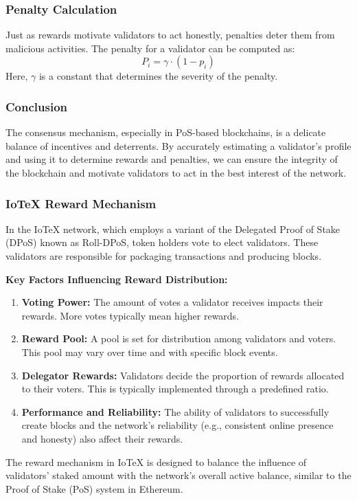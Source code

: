 \documentclass{beamer}
\begin{document}
\begin{frame}
\frametitle{Penalty Calculation}
Just as rewards motivate validators to act honestly, penalties deter them from malicious activities. The penalty for a validator can be computed as:
\[ P_i = \gamma \cdot (1 - p_i) \]
Here, \( \gamma \) is a constant that determines the severity of the penalty.
\end{frame}

\begin{frame}
\frametitle{Conclusion}
The consensus mechanism, especially in PoS-based blockchains, is a delicate balance of incentives and deterrents. By accurately estimating a validator's profile and using it to determine rewards and penalties, we can ensure the integrity of the blockchain and motivate validators to act in the best interest of the network.
\end{frame}



\begin{frame}
\frametitle{IoTeX Reward Mechanism}
\scriptsize
In the IoTeX network, which employs a variant of the Delegated Proof of Stake (DPoS) known as Roll-DPoS, token holders vote to elect validators. These validators are responsible for packaging transactions and producing blocks.

\textbf{Key Factors Influencing Reward Distribution:}
\begin{enumerate}
  \item \textbf{Voting Power:} The amount of votes a validator receives impacts their rewards. More votes typically mean higher rewards.
  \item \textbf{Reward Pool:} A pool is set for distribution among validators and voters. This pool may vary over time and with specific block events.
  \item \textbf{Delegator Rewards:} Validators decide the proportion of rewards allocated to their voters. This is typically implemented through a predefined ratio.
  \item \textbf{Performance and Reliability:} The ability of validators to successfully create blocks and the network's reliability (e.g., consistent online presence and honesty) also affect their rewards.
\end{enumerate}

The reward mechanism in IoTeX is designed to balance the influence of validators' staked amount with the network's overall active balance, similar to the Proof of Stake (PoS) system in Ethereum.
\end{frame}
\end{document}
